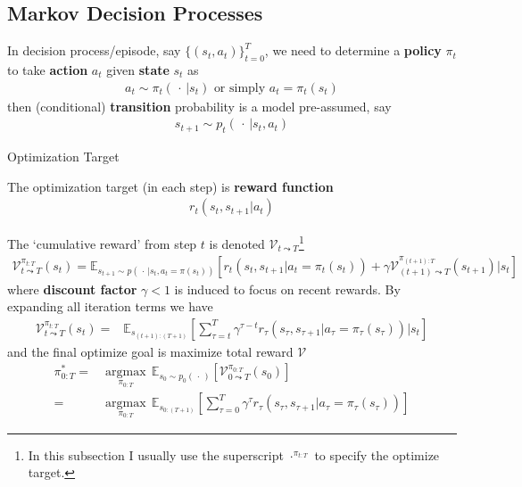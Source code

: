 \subsection{Markov Decision Processes}
In decision process/episode, say $ \{(s_t,a_t)\}_{t=0}^T $, we need to determine a \textbf{policy} $ \pi_t $ to take \textbf{action}  $ a_t $ given \textbf{state}  $ s_t $ as
\begin{align}
    a_t\sim \pi_t(\, \cdot \,| s_t) \text{ or simply }a_t=\pi_t(s_t)
\end{align}
then (conditional) \textbf{transition}  probability is a model pre-assumed, say
\begin{align}
    s_{t+1}\sim p_t\left(\, \cdot \, |s_t,a_t\right) 
\end{align}


\begin{point}
    Optimization Target
\end{point}

The optimization target (in each step) is \textbf{reward function} 
\begin{align}
    r_t(s_t,s_{t+1}|a_t)
\end{align}

The `cumulative reward' from step $ t $ is denoted $ \mathcal{V}_{t\leadsto T} $\footnote{In this subsection I usually use the superscript $ \cdot ^{\pi_{t:T}} $ to specify the optimize target.} 
\begin{align}\label{EqaVLearningIteration}
    \mathcal{V}_{t\leadsto T}^{\pi_{t:T}}(s_t)=\mathbb{E}_{s_{t+1}\sim p\left(\, \cdot \, |s_t,a_t=\pi(s_t)\right)}\left[ r_t\left(s_t,s_{t+1}|a_t=\pi_t(s_t)\right)+\gamma \mathcal{V}_{(t+1)\leadsto T}^{\pi_{(t+1):T}} (s_{t+1})\big|s_t\right]
\end{align}
where \textbf{discount factor} $ \gamma<1  $ is induced to focus on recent rewards. By expanding all iteration terms we have
\begin{align}
    \mathcal{V}_{t\leadsto T}^{\pi_{t:T}}(s_t)=&\mathbb{E}_{s_{(t+1):(T+1)}}\left[ \sum_{\tau = t}^T\gamma ^{\tau-t}r_\tau\left(s_\tau,s_{\tau+1}|a_\tau=\pi_\tau(s_\tau)\right)\big|s_t \right]
\end{align}
and the final optimize goal is maximize total reward $ \mathcal{V} $
\begin{align}\label{EqaVLearningTarget}
    \pi_{0:T}^*=&\mathop{\arg\max}\limits_{\pi_{0:T}}\,\mathbb{E}_{s_0\sim p_0(\, \cdot \, )}\left[ \mathcal{V}_{0\leadsto T}^{\pi_{0:T}}(s_0) \right]  \\
    =&\mathop{\arg\max}\limits_{\pi_{0:T}}\,\mathbb{E}_{s_{0:(T+1)}}\left[ \sum_{\tau = 0}^T\gamma ^{\tau}r_\tau\left(s_\tau,s_{\tau+1}|a_\tau=\pi_\tau(s_\tau)\right) \right]
\end{align}



